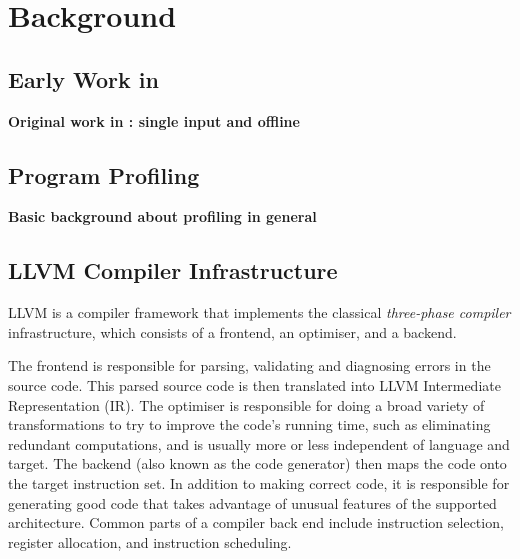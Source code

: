 \chapter{Background}

\section{Early Work in {\IterComp}}

\textbf{Original work in {\IterComp}: single input and offline}

\section{Program Profiling}

\textbf{Basic background about profiling in general}

\section{LLVM Compiler Infrastructure}

LLVM is a compiler framework that implements the classical \textit{three-phase compiler} infrastructure, which consists of a frontend, an optimiser, and a backend.

The frontend is responsible for parsing, validating and diagnosing errors in the source code.
This parsed source code is then translated into LLVM Intermediate Representation (IR).
The optimiser is responsible for doing a broad variety of transformations to try to improve the code's running time, such as eliminating redundant computations, and is usually more or less independent of language and target.
The backend (also known as the code generator) then maps the code onto the target instruction set. In addition to making correct code, it is responsible for generating good code that takes advantage of unusual features of the supported architecture. Common parts of a compiler back end include instruction selection, register allocation, and instruction scheduling.

